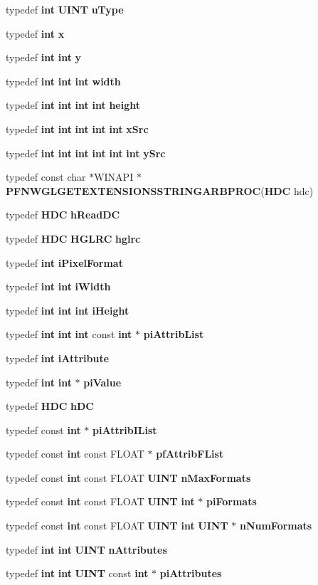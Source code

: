 \begin{DoxyCompactItemize}
\item 
typedef {\bf int} {\bf U\+I\+NT} {\bf u\+Type}
\item 
typedef {\bf int} {\bf x}
\item 
typedef {\bf int} {\bf int} {\bf y}
\item 
typedef {\bf int} {\bf int} {\bf int} {\bf width}
\item 
typedef {\bf int} {\bf int} {\bf int} {\bf int} {\bf height}
\item 
typedef {\bf int} {\bf int} {\bf int} {\bf int} {\bf int} {\bf x\+Src}
\item 
typedef {\bf int} {\bf int} {\bf int} {\bf int} {\bf int} {\bf int} {\bf y\+Src}
\item 
typedef const char $\ast$W\+I\+N\+A\+PI $\ast$ {\bf P\+F\+N\+W\+G\+L\+G\+E\+T\+E\+X\+T\+E\+N\+S\+I\+O\+N\+S\+S\+T\+R\+I\+N\+G\+A\+R\+B\+P\+R\+OC}({\bf H\+DC} hdc)
\item 
typedef {\bf H\+DC} {\bf h\+Read\+DC}
\item 
typedef {\bf H\+DC} {\bf H\+G\+L\+RC} {\bf hglrc}
\item 
typedef {\bf int} {\bf i\+Pixel\+Format}
\item 
typedef {\bf int} {\bf int} {\bf i\+Width}
\item 
typedef {\bf int} {\bf int} {\bf int} {\bf i\+Height}
\item 
typedef {\bf int} {\bf int} {\bf int} const {\bf int} $\ast$ {\bf pi\+Attrib\+List}
\item 
typedef {\bf int} {\bf i\+Attribute}
\item 
typedef {\bf int} {\bf int} $\ast$ {\bf pi\+Value}
\item 
typedef {\bf H\+DC} {\bf h\+DC}
\item 
typedef const {\bf int} $\ast$ {\bf pi\+Attrib\+I\+List}
\item 
typedef const {\bf int} const F\+L\+O\+AT $\ast$ {\bf pf\+Attrib\+F\+List}
\item 
typedef const {\bf int} const F\+L\+O\+AT {\bf U\+I\+NT} {\bf n\+Max\+Formats}
\item 
typedef const {\bf int} const F\+L\+O\+AT {\bf U\+I\+NT} {\bf int} $\ast$ {\bf pi\+Formats}
\item 
typedef const {\bf int} const F\+L\+O\+AT {\bf U\+I\+NT} {\bf int} {\bf U\+I\+NT} $\ast$ {\bf n\+Num\+Formats}
\item 
typedef {\bf int} {\bf int} {\bf U\+I\+NT} {\bf n\+Attributes}
\item 
typedef {\bf int} {\bf int} {\bf U\+I\+NT} const {\bf int} $\ast$ {\bf pi\+Attributes}

\end{DoxyCompactItemize}
